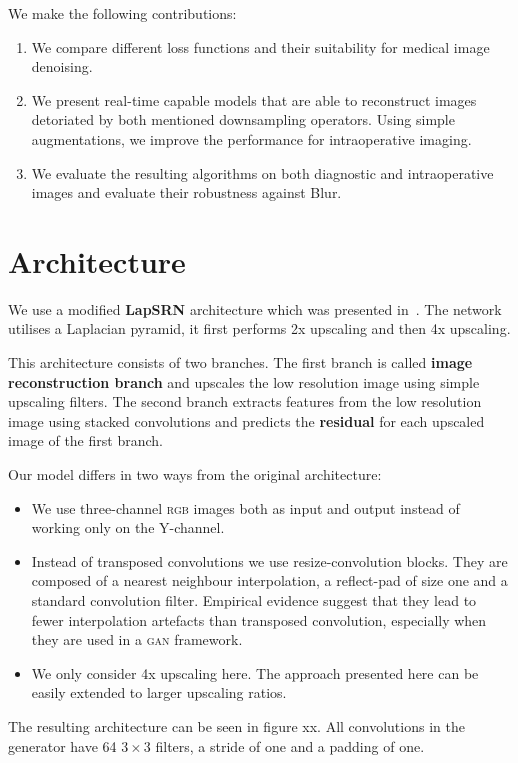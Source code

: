 \documentclass{scrartcl}
\begin{document}
We make the following contributions:
\begin{enumerate}
\item We compare different loss functions and their suitability for medical image denoising.
\item We present real-time capable models that are able to reconstruct images detoriated by both mentioned downsampling operators.
  Using simple augmentations, we improve the performance for intraoperative imaging.
\item We evaluate the resulting algorithms on both diagnostic and intraoperative images and evaluate their robustness against Blur.
\end{enumerate}


\section{Architecture}
We use a modified \textbf{LapSRN} architecture which was presented in~\cite{LapSRN}.
The network utilises a Laplacian pyramid, it first performs 2x upscaling and then 4x upscaling.

This architecture consists of two branches.
The first branch is called \textbf{image reconstruction branch} and upscales the low resolution image using simple upscaling filters.
The second branch extracts features from the low resolution image using stacked convolutions and predicts the \textbf{residual} for each upscaled image of the first branch.

Our model differs in two ways from the original architecture:
\begin{itemize}
\item We use three-channel \textsc{rgb} images both as input and output instead of working only on the Y-channel.
\item Instead of transposed convolutions we use resize-convolution blocks.
  They are composed of a nearest neighbour interpolation, a reflect-pad of size one and a standard convolution filter.
  Empirical evidence suggest that they lead to fewer interpolation artefacts than transposed convolution, especially when they are used in a \textsc{gan} framework\cite{deconvolution}.
\item We only consider 4x upscaling here.
  The approach presented here can be easily extended to larger upscaling ratios.
\end{itemize}
The resulting architecture can be seen in figure xx.
All convolutions in the generator have 64 $3 \times 3$ filters, a stride of one and a padding of one.
\end{document}
